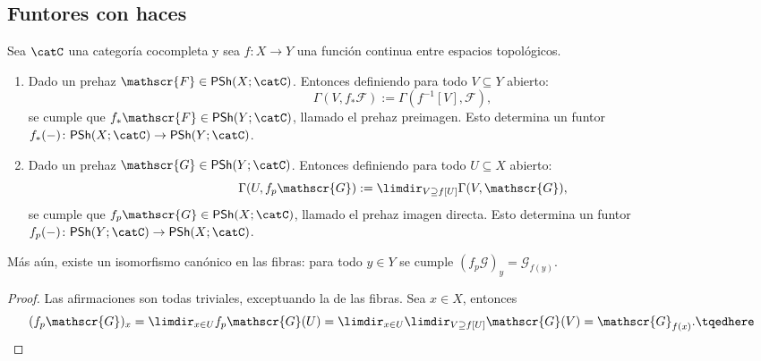 \subsection{Funtores con haces}
\begin{prop}
	Sea $\catC$ una categoría cocompleta y sea $f \colon X \to Y$ una función continua entre espacios topológicos.
	\begin{enumerate}
		\item Dado un prehaz $\mathscr{F} \in \mathsf{PSh}(X; \catC)$. Entonces definiendo para todo $V \subseteq Y$ abierto:
			$$ \Gamma(V, f_*\mathscr{F}) := \Gamma(f^{-1} [V ], \mathscr{F} ), $$
			se cumple que $f_*\mathscr{F} \in \mathsf{PSh}(Y; \catC)$, llamado el prehaz preimagen.
			Esto determina un funtor $f_*(-) \colon \mathsf{PSh}(X; \catC) \to \mathsf{PSh}(Y ; \catC)$.

		\item  Dado un prehaz $\mathscr{G} \in \mathsf{PSh}(Y; \catC)$.
			Entonces definiendo para todo $U \subseteq X$ abierto:
			$$ \Gamma(U, f_p \mathscr{G} ) := \limdir_{V \supseteq f[U]} \Gamma(V, \mathscr{G} ), $$
			se cumple que $f_p \mathscr{G} \in \mathsf{PSh}(X; \catC)$, llamado el prehaz imagen directa.
			Esto determina un funtor $f_p(-) \colon \mathsf{PSh}(Y; \catC) \to \mathsf{PSh}(X; \catC)$.
	\end{enumerate}
	Más aún, existe un isomorfismo canónico en las fibras: para todo $y \in Y$ se cumple $(f_p \mathscr{G})_y = \mathscr{G}_{f(y)}$.
\end{prop}
\begin{proof}
	Las afirmaciones son todas triviales, exceptuando la de las fibras. Sea $x \in X$, entonces
	\begin{equation}
		(f_p \mathscr{G})_x = \limdir_{x\in U} f_p \mathscr{G}(U) = \limdir_{x\in U} \limdir_{V \supseteq f[U]} \mathscr{G}(V ) = \mathscr{G}_{f(x)}.
		\tqedhere
	\end{equation}
\end{proof}

